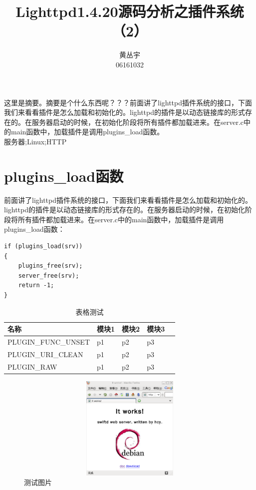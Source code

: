 \documentclass[12pt, dvipdfm]{article}
\begin{document}
\title{Lighttpd1.4.20源码分析之插件系统（2）}
\author{黄丛宇\\06161032}
\maketitle

\tableofcontents

\newpage

\zhabstract 
这里是摘要。摘要是个什么东西呢？？？前面讲了lighttpd插件系统的接口，下面我们来看看插件是怎么加载和初始化的。lighttpd的插件是以动态链接库的形式存在的。在服务器启动的时候，在初始化阶段将所有插件都加载进来。在server.c中的main函数中，加载插件是调用plugins\_load函数。\\

{\zhkeywords 服务器;Linux;HTTP}

\section{plugins\_load函数}
前面讲了lighttpd插件系统的接口，下面我们来看看插件是怎么加载和初始化的。lighttpd的插件是以动态链接库的形式存在的。在服务器启动的时候，在初始化阶段将所有插件都加载进来。在server.c中的main函数中，加载插件是调用plugins\_load函数：

\begin{verbatim}
if (plugins_load(srv))
{
	plugins_free(srv);
	server_free(srv);
	return -1;
}
\end{verbatim}


\begin{table}[htbp]
\caption{表格测试}
\centering
\begin{tabularx}{\textwidth}{XXXXl} %
\toprule
\centering 名称 & \centering  模块1 & \centering  模块2 &\centering 模块3&\\
\midrule
\centering PLUGIN\_FUNC\_UNSET &\centering  p1 &\centering  p2 &\centering  p3&\\
\centering PLUGIN\_URI\_CLEAN &\centering  p1 &\centering  p2 &\centering  p3&\\
\centering PLUGIN\_RAW &\centering  p1 &\centering  p2 &\centering  p3&\\
\bottomrule
\end{tabularx}
\end{table}

\begin{figure}[htbp]
\centering
\caption{测试图片}
\includegraphics[height=5cm, width=16cm]{pics/test.eps}
\end{figure}
\end{document}
